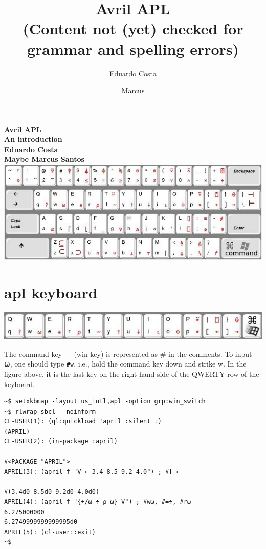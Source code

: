 \documentclass[a4paper,12pt]{book}
\title{\large Avril APL\\
{\normalsize (Content not (yet) checked for grammar and spelling errors)}}
\author{Eduardo Costa \and Marcus}
\date{}
\begin{document}
\begin{titlepage}
    \centering
    \vfill
    {\bfseries\Large
        Avril APL\\
        An introduction\\
        \vskip2cm
        Eduardo Costa\\
        Maybe Marcus Santos\\
    }    
    \vfill
    \includegraphics[width=15cm]{figs/apl-keyboard.jpg}
    \vfill
    \vfill
\end{titlepage}

\thispagestyle{empty}

\clearpage

\chapter{apl keyboard}
\includegraphics{figs/qwerty-row.jpg}

\large
The command key ~\cmdkey~ (win key)
is represented as \# in the comments.
To input ⍵, one should type \verb|#w|, i.e.,
hold the command key down and strike w.
In the figure above, it is the last key
on the right-hand side of the QWERTY row
of the keyboard.

\label{april:install}
\large
\begin{lstlisting}[language=apl]
~$ setxkbmap -layout us_intl,apl -option grp:win_switch
~$ rlwrap sbcl --noinform
CL-USER(1): (ql:quickload 'april :silent t)
(APRIL)
CL-USER(2): (in-package :april)

#<PACKAGE "APRIL">
APRIL(3): (april-f "V ← 3.4 8.5 9.2 4.0") ; #[ ←

#(3.4d0 8.5d0 9.2d0 4.0d0)
APRIL(4): (april-f "{+/⍵ ÷ ⍴ ⍵} V") ; #w⍵, #=÷, #r⍵
6.275000000
6.2749999999999995d0
APRIL(5): (cl-user::exit)
~$ 
\end{lstlisting}
\end{document}

